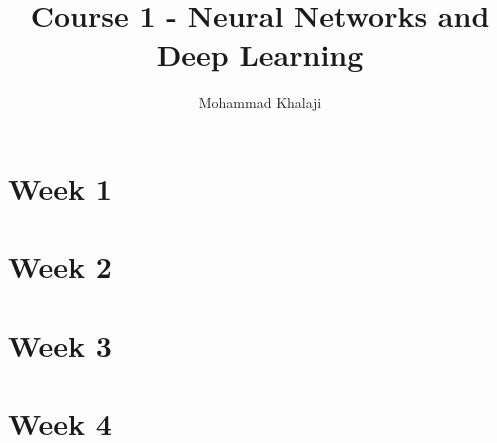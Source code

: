 \documentclass[10pt,a4paper]{article}
\author{Mohammad Khalaji}
\title{Course 1 - Neural Networks and Deep Learning}
\newcommand{\lay}[2][]{^{[#2]#1}}
\begin{document}
\maketitle

\section{Week 1}

\newpage
\section{Week 2}

\newpage
\section{Week 3}

\newpage
\section{Week 4}

\end{document}

